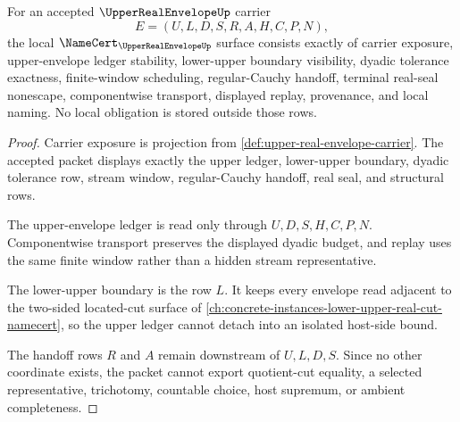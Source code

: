 \begin{theorem}
\label{thm:upper-real-envelope-namecert-obligations}
For an accepted $\UpperRealEnvelopeUp$ carrier
$$
E=(U,L,D,S,R,A,H,C,P,N),
$$
the local $\NameCert_{\UpperRealEnvelopeUp}$ surface consists exactly of carrier exposure, upper-envelope ledger stability, lower-upper boundary visibility, dyadic tolerance exactness, finite-window scheduling, regular-Cauchy handoff, terminal real-seal nonescape, componentwise transport, displayed replay, provenance, and local naming. No local obligation is stored outside those rows.
\end{theorem}
\begin{proof}
Carrier exposure is projection from \autoref{def:upper-real-envelope-carrier}. The accepted packet displays exactly the upper ledger, lower-upper boundary, dyadic tolerance row, stream window, regular-Cauchy handoff, real seal, and structural rows.

The upper-envelope ledger is read only through $U,D,S,H,C,P,N$. Componentwise transport preserves the displayed dyadic budget, and replay uses the same finite window rather than a hidden stream representative.

The lower-upper boundary is the row $L$. It keeps every envelope read adjacent to the two-sided located-cut surface of \autoref{ch:concrete-instances-lower-upper-real-cut-namecert}, so the upper ledger cannot detach into an isolated host-side bound.

The handoff rows $R$ and $A$ remain downstream of $U,L,D,S$. Since no other coordinate exists, the packet cannot export quotient-cut equality, a selected representative, trichotomy, countable choice, host supremum, or ambient completeness.
\end{proof}

